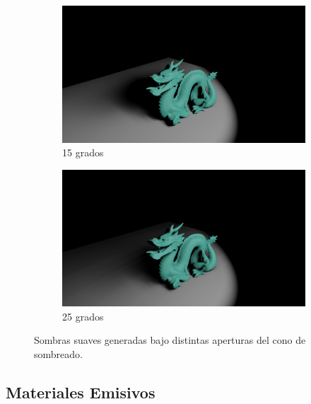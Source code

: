 \begin{figure}[H]
	\centering
	\begin{subfigure}[b]{.49\linewidth}
		\centering
		\captionsetup{justification=centering}
		\caption*{15 grados}
		\includegraphics[width=\linewidth]{media/finals/shadow_15.png}
	\end{subfigure}%
	\hspace{0.01\textwidth}
	\begin{subfigure}[b]{.49\linewidth}
		\centering
		\captionsetup{justification=centering}
		\caption*{25 grados}
		\includegraphics[width=\linewidth]{media/finals/shadow_25.png}
	\end{subfigure}%
	\caption{Sombras suaves generadas bajo distintas aperturas del cono de sombreado.}
	\label{fig:soft_aperture}
\end{figure}



\subsection{Materiales Emisivos}


